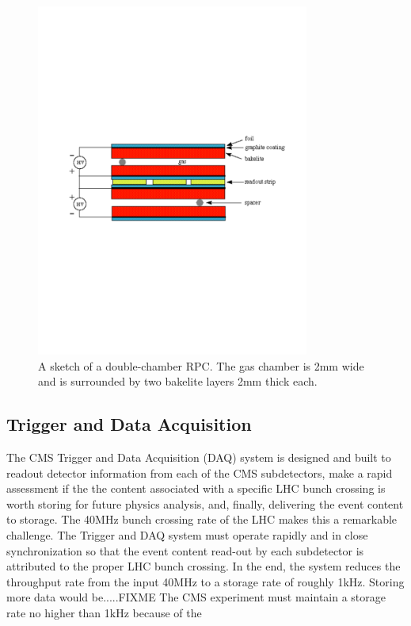 \begin{figure}[htbp]
\centering
     \includegraphics[width=0.8\textwidth]{cms_and_lhc/plots/cms_muon_rpc.pdf}
     \caption{
A sketch of a double-chamber RPC. The gas chamber is 2mm wide and is surrounded by two
bakelite layers 2mm thick each.
     }
     \label{fig:cms_muon_rpc}
\end{figure}



\subsection{Trigger and Data Acquisition}
The CMS Trigger and Data Acquisition (DAQ) system is designed and built to readout detector
information from each of the CMS subdetectors, make a rapid assessment if the the content
associated with a specific LHC bunch crossing is worth storing for future physics analysis,
and, finally, delivering the event content to storage. The 40MHz bunch crossing rate of
the LHC makes this a remarkable challenge. The Trigger and DAQ system must operate rapidly
and in close synchronization so that the event content read-out by each subdetector is attributed
to the proper LHC bunch crossing. In the end, the system reduces the throughput rate from the
input 40MHz to a storage rate of roughly 1kHz. Storing more data would be.....FIXME
The CMS experiment must maintain a storage rate 
no higher than 1kHz because of the 



